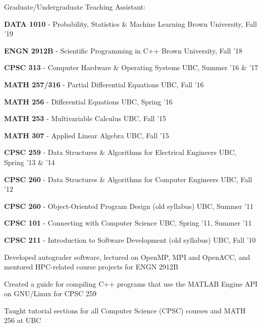 \documentclass[margin,line]{res}
\newenvironment{list1}{
  \begin{list}{\ding{113}}{
      \setlength{\itemsep}{0in}
      \setlength{\parsep}{0in} \setlength{\parskip}{0in}
      \setlength{\topsep}{0in} \setlength{\partopsep}{0in}
      \setlength{\leftmargin}{0.17in}}}{\end{list}}
\newenvironment{list3}{
  \begin{list}{\textopenbullet}{
      \setlength{\itemsep}{0in}
      \setlength{\parsep}{0in} \setlength{\parskip}{0in}
      \setlength{\topsep}{0in} \setlength{\partopsep}{0in}
      \setlength{\leftmargin}{0.1in}}}{\end{list}}
\begin{document}
\begin{resume}

Graduate/Undergraduate Teaching Assistant:
\vspace*{.2cm}

\begin{list1}
\setlength\itemsep{0.25em}
\item[] {\bf DATA 1010} - Probability, Statistics \& Machine Learning \hfill Brown University, Fall '19
\item[] {\bf ENGN 2912B} - Scientific Programming in C++ \hfill Brown University, Fall '18
\item[] {\bf CPSC 313} - Computer Hardware \& Operating Systems \hfill UBC, Summer '16 \& '17
\item[] {\bf MATH 257/316} - Partial Differential Equations \hfill UBC, Fall '16
\item[] {\bf MATH 256} - Differential Equations \hfill UBC, Spring '16
\item[] {\bf MATH 253} - Multivariable Calculus \hfill UBC, Fall '15
\item[] {\bf MATH 307} - Applied Linear Algebra \hfill UBC, Fall '15
\item[] {\bf CPSC 259} - Data Structures \& Algorithms for Electrical Engineers \hfill UBC, Spring '13 \& '14
\item[] {\bf CPSC 260} - Data Structures \& Algorithms for Computer Engineers \hfill UBC, Fall '12
\item[] {\bf CPSC 260} - Object-Oriented Program Design (old syllabus) \hfill UBC, Summer '11
\item[] {\bf CPSC 101} - Connecting with Computer Science \hfill UBC, Spring '11, Summer '11
\item[] {\bf CPSC 211} - Introduction to Software Development (old syllabus) \hfill UBC, Fall '10\\
\begin{list3}
\vspace*{-.05cm}
\setlength\itemsep{0.25em}
\item Developed autograder software, lectured on OpenMP, MPI and OpenACC, and mentored HPC-related course projects for ENGN 2912B
\item Created a guide for compiling C++ programs that use the MATLAB Engine API on GNU/Linux for CPSC 259
\item Taught tutorial sections for all Computer Science (CPSC) courses and MATH 256 at UBC
\end{list3}
\end{list1}


\end{resume}
\end{document}

